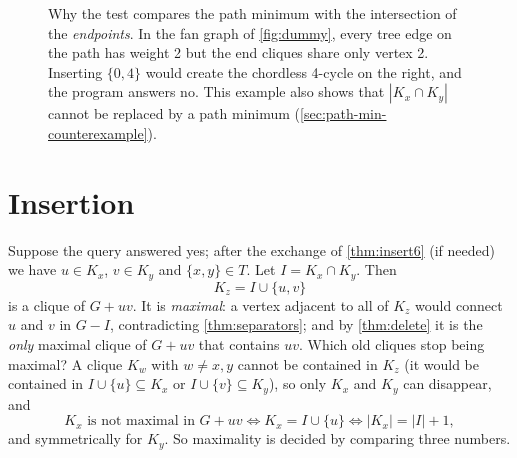 \documentclass[11pt,a4paper,oneside]{report}
\theoremstyle{plain}
\theoremstyle{definition}
\theoremstyle{remark}
\newcommand{\yes}{\textsf{yes}}
\newcommand{\no}{\textsf{no}}
\newcommand{\op}[1]{\textsf{#1}}
\begin{document}
\begin{figure}[ht]
\centering
{}
\caption[A rejected insertion query]{Why the test compares the path minimum with the intersection of the \emph{endpoints}.
In the fan graph of \cref{fig:dummy}, every tree edge on the path has weight 2 but the end
cliques share only vertex 2. Inserting \(\{0,4\}\) would create the chordless 4-cycle on the
right, and the program answers \no. This example also shows that \(|K_x\cap K_y|\) cannot be
replaced by a path minimum (\cref{sec:path-min-counterexample}).}
\label{fig:insert-query-no}
\end{figure}

\section{Insertion}\label{sec:insert-math}
Suppose the query answered \yes; after the exchange of \cref{thm:insert6} (if needed) we have
\(u\in K_x\), \(v\in K_y\) and \(\{x,y\}\in T\). Let \(I=K_x\cap K_y\). Then
\[ K_z=I\cup\{u,v\} \]
is a clique of \(G+uv\). It is \emph{maximal}: a vertex adjacent to all of \(K_z\) would connect
\(u\) and \(v\) in \(G-I\), contradicting \cref{thm:separators}; and by \cref{thm:delete} it is
the \emph{only} maximal clique of \(G+uv\) that contains \(uv\). Which old cliques stop being
maximal? A clique \(K_w\) with \(w\ne x,y\) cannot be contained in \(K_z\) (it would be
contained in \(I\cup\{u\}\subseteq K_x\) or \(I\cup\{v\}\subseteq K_y\)), so only \(K_x\) and
\(K_y\) can disappear, and
\begin{equation}\label{eq:insert-maximal}
K_x \text{ is not maximal in } G+uv \iff K_x=I\cup\{u\} \iff |K_x|=|I|+1,
\end{equation}
and symmetrically for \(K_y\). So maximality is decided by comparing three numbers.
\end{document}
